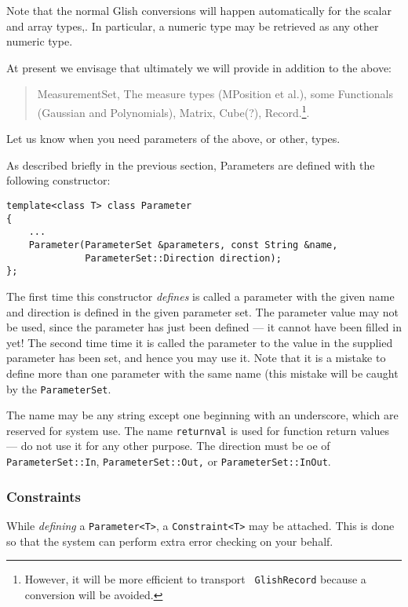 Note that the normal Glish conversions will happen automatically for
the scalar and array types,. In particular, a numeric type may be
retrieved as any other numeric type.

At present we envisage that ultimately we will provide in addition to the
above:
\begin{quote}
MeasurementSet, The measure types (MPosition et al.), some
Functionals (Gaussian and Polynomials), Matrix, Cube(?),
Record.\footnote{However, it will be more efficient to transport {\tt
GlishRecord} because a conversion will be avoided.}.
\end{quote}
Let us know when you need parameters of the above, or other, types.

As described briefly in the previous section, Parameters are defined
with the following constructor:
\begin{verbatim}
template<class T> class Parameter
{
    ...
    Parameter(ParameterSet &parameters, const String &name, 
              ParameterSet::Direction direction);
};
\end{verbatim}

The first time this constructor {\em defines} is called a parameter
with the given name and direction is defined in the given parameter
set. The parameter value may not be used, since the parameter has just
been defined --- it cannot have been filled in yet! The second time
time it is called the parameter to the value in the supplied parameter
has been set, and hence you may use it. Note that it is a mistake to
define more than one parameter with the same name (this mistake will
be caught by the {\tt ParameterSet}.

The name may be any string except one beginning with an underscore,
which are reserved for system use. The name {\tt returnval} is used
for function return values --- do not use it for any other
purpose. The direction must be oe of {\tt ParameterSet::In},
{\tt ParameterSet::Out,} or {\tt ParameterSet::InOut}.

\subsubsection{Constraints}

While {\em defining} a {\tt Parameter<T>}, a {\tt Constraint<T>}
may be attached. This is done so that the system can perform extra
error checking on your behalf.

